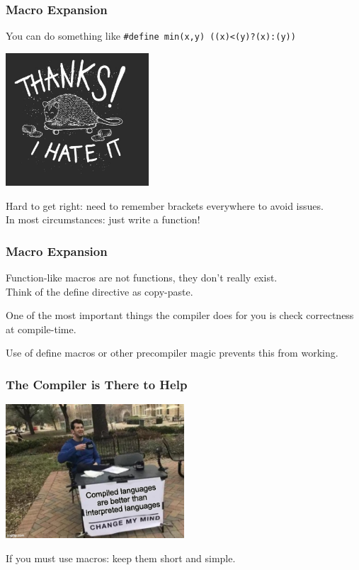 \begin{frame}
\frametitle{Macro Expansion}

You can do something like \texttt{\#define min(x,y) ((x)<(y)?(x):(y))}

\begin{center}
  \includegraphics[width=0.4\textwidth]{images/thanksihateit.jpg}
\end{center}

Hard to get right: need to remember brackets everywhere to avoid issues.\\
\quad In most circumstances: just write a function!

\end{frame}

\begin{frame}
\frametitle{Macro Expansion}

Function-like macros are not functions, they don't really exist.\\
\quad Think of the define directive as copy-paste.

One of the most important things the compiler does for you is check correctness at compile-time.

Use of define macros or other precompiler magic prevents this from working.

\end{frame}


\begin{frame}
\frametitle{The Compiler is There to Help}

\begin{center}
  \includegraphics[width=0.5\textwidth]{images/compiled.jpg}
\end{center}

If you must use macros: keep them short and simple.

\end{frame}

